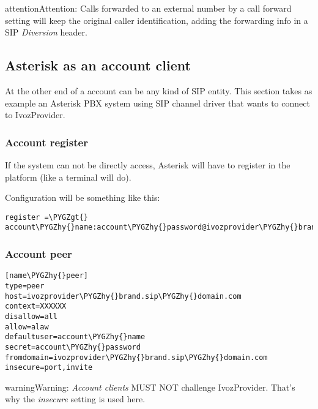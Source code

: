 \documentclass[letterpaper,10pt,english]{sphinxmanual}
\def\PYGZgt{\char`\>}
\def\PYGZhy{\char`\-}
\begin{document}
\begin{notice}{attention}{Attention:}
Calls forwarded to an external number by a call forward setting will keep the original
caller identification, adding the forwarding info in a SIP \emph{Diversion} header.
\end{notice}


\subsection{Asterisk as an account client}
\label{retail/retail_accounts:asterisk-as-an-account-client}
At the other end of a account can be any kind of SIP entity. This section takes
as example an Asterisk PBX system using SIP channel driver that wants to connect
to IvozProvider.


\subsubsection{Account register}
\label{retail/retail_accounts:account-register}
If the system can not be directly access, Asterisk will have to register in the
platform (like a terminal will do).

Configuration will be something like this:

\begin{Verbatim}[commandchars=\\\{\}]
register =\PYGZgt{} account\PYGZhy{}name:account\PYGZhy{}password@ivozprovider\PYGZhy{}brand.sip\PYGZhy{}domain.com
\end{Verbatim}


\subsubsection{Account peer}
\label{retail/retail_accounts:account-peer}
\begin{Verbatim}[commandchars=\\\{\}]
[name\PYGZhy{}peer]
type=peer
host=ivozprovider\PYGZhy{}brand.sip\PYGZhy{}domain.com
context=XXXXXX
disallow=all
allow=alaw
defaultuser=account\PYGZhy{}name
secret=account\PYGZhy{}password
fromdomain=ivozprovider\PYGZhy{}brand.sip\PYGZhy{}domain.com
insecure=port,invite
\end{Verbatim}

\begin{notice}{warning}{Warning:}
\emph{Account clients} MUST NOT challenge IvozProvider. That's
why the \emph{insecure} setting is used here.
\end{notice}
\end{document}
